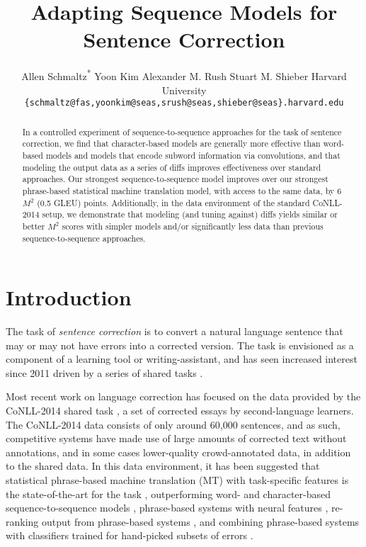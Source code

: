 \documentclass[11pt,letterpaper]{article}
\title{Adapting Sequence Models for Sentence Correction}
\author{Allen Schmaltz{\textsuperscript{*}} \And Yoon Kim \And Alexander M. Rush \And Stuart M. Shieber \AND
Harvard University \\
{\tt \footnotesize \{schmaltz@fas,yoonkim@seas,srush@seas,shieber@seas\}.harvard.edu} \\
{\normalfont{\footnotesize\textsuperscript{*}Part of this work was completed while as an intern at Rakuten.}}
}
\date{}
\begin{document}
\maketitle

\begin{abstract}
In a controlled experiment of sequence-to-sequence approaches for the task of sentence correction, we find that character-based models are generally more effective than word-based models and models that encode subword information via convolutions, and that modeling the output data as a series of diffs improves effectiveness over standard approaches. Our strongest sequence-to-sequence model improves over our strongest phrase-based statistical machine translation model, with access to the same data, by 6 $M^2$ (0.5 GLEU) points. Additionally, in the data environment of the standard CoNLL-2014 setup, we demonstrate that modeling (and tuning against) diffs yields similar or better $M^2$ scores with simpler models and/or significantly less data than previous sequence-to-sequence approaches.
 \end{abstract}

\section{Introduction}
 The task of \emph{sentence correction} is to convert a natural language sentence that may or may not have errors into a corrected version. The task is envisioned as a component of a learning tool or writing-assistant, and has seen increased interest since 2011 driven by a  series of shared tasks  \cite{DaleAndKilgarriff-2011-HOOPilot,DaleEtAl-2012-HOO2012PrepAndDetErrors,NgEtAl-2013-CoNLL-SharedTask2013,NgEtAl-2014-SharedTask2014}. 

Most recent work on language correction has focused on the data provided by the CoNLL-2014 shared task \cite{NgEtAl-2014-SharedTask2014}, a set of corrected essays by second-language learners. The CoNLL-2014 data consists of only around 60,000 sentences, and as such, competitive systems have made use of large amounts of corrected text without annotations, and in some cases lower-quality crowd-annotated data, in addition to the shared data. In this data environment, it has been suggested that statistical phrase-based machine translation (MT) with task-specific features is the state-of-the-art for the task \cite{junczysdowmunt-grundkiewicz:2016:EMNLP2016}, outperforming word- and character-based sequence-to-sequence models \cite{yuan-briscoe:2016:N16-1,XieEtAl.2016-arxiv-NLCwithCharAttention,JiEtal2017arXiv-NestedAttention}, phrase-based systems with neural features \cite{ChollampattElAl-2016-SMTwithNNfeatures,chollampatt-hoang-ng:2016:EMNLP2016}, re-ranking output from phrase-based systems \cite{HoangEtAl2016-IJCAI-NbestSMTReranking}, and combining phrase-based systems with classifiers trained for hand-picked subsets of errors \cite{rozovskaya-roth:2016:P16-1}.
\end{document}
